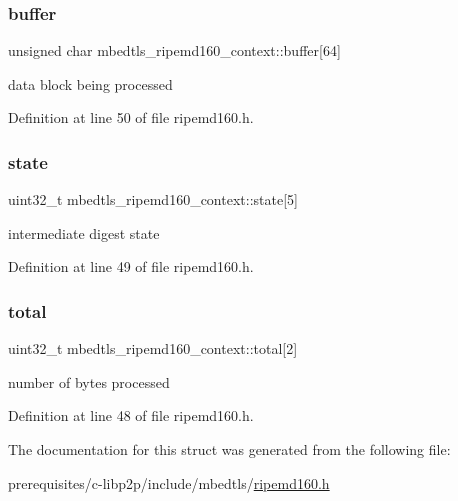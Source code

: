 \subsubsection{\texorpdfstring{buffer}{buffer}}
{\footnotesize\ttfamily unsigned char mbedtls\+\_\+ripemd160\+\_\+context\+::buffer\mbox{[}64\mbox{]}}

data block being processed 

Definition at line 50 of file ripemd160.\+h.

\mbox{\label{structmbedtls__ripemd160__context_af56cf97ec4c54ae4bb540422b459782c}} 
\subsubsection{\texorpdfstring{state}{state}}
{\footnotesize\ttfamily uint32\+\_\+t mbedtls\+\_\+ripemd160\+\_\+context\+::state\mbox{[}5\mbox{]}}

intermediate digest state 

Definition at line 49 of file ripemd160.\+h.

\mbox{\label{structmbedtls__ripemd160__context_afc1ec88d27b692be26d819a752be8d4a}} 
\subsubsection{\texorpdfstring{total}{total}}
{\footnotesize\ttfamily uint32\+\_\+t mbedtls\+\_\+ripemd160\+\_\+context\+::total\mbox{[}2\mbox{]}}

number of bytes processed 

Definition at line 48 of file ripemd160.\+h.



The documentation for this struct was generated from the following file\+:\begin{DoxyCompactItemize}
\item 
prerequisites/c-\/libp2p/include/mbedtls/\mbox{\hyperlink{ripemd160_8h}{ripemd160.\+h}}\end{DoxyCompactItemize}
